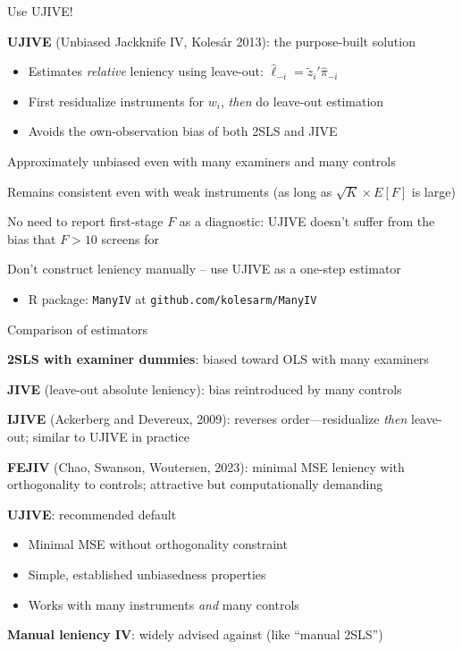 \documentclass[notes,11pt, aspectratio=169]{beamer}
\newenvironment{wideitemize}{\itemize\addtolength{\itemsep}{10pt}}{\enditemize}
\begin{document}
\begin{frame}{Use UJIVE!}
  \begin{wideitemize}
  \item \textbf{UJIVE} (Unbiased Jackknife IV, Koles\'{a}r 2013): the purpose-built solution
    \begin{itemize}
    \item Estimates \emph{relative} leniency using leave-out: $\hat{\ell}_{-i} = \tilde{z}_{i}'\hat{\pi}_{-i}$
    \item First residualize instruments for $w_{i}$, \emph{then} do leave-out estimation
    \item Avoids the own-observation bias of both 2SLS and JIVE
    \end{itemize}
  \item Approximately unbiased even with many examiners and many controls
  \item Remains consistent even with weak instruments (as long as $\sqrt{K} \times E[F]$ is large)
  \item No need to report first-stage $F$ as a diagnostic: UJIVE doesn't suffer from the bias that $F > 10$ screens for
  \item Don't construct leniency manually -- use UJIVE as a one-step estimator
    \begin{itemize}
    \item R package: \texttt{ManyIV} at \texttt{github.com/kolesarm/ManyIV}
    \end{itemize}
  \end{wideitemize}
\end{frame}

\begin{frame}{Comparison of estimators}
  \begin{wideitemize}
  \item \textbf{2SLS with examiner dummies}: biased toward OLS with many examiners
  \item \textbf{JIVE} (leave-out absolute leniency): bias reintroduced by many controls
  \item \textbf{IJIVE} (Ackerberg and Devereux, 2009): reverses order---residualize \emph{then} leave-out; similar to UJIVE in practice
  \item \textbf{FEJIV} (Chao, Swanson, Woutersen, 2023): minimal MSE leniency with orthogonality to controls; attractive but computationally demanding 
  \item \textbf{UJIVE}: recommended default
    \begin{itemize}
    \item Minimal MSE without orthogonality constraint
    \item Simple, established unbiasedness properties
    \item Works with many instruments \emph{and} many controls
    \end{itemize}
  \item \textbf{Manual leniency IV}: widely advised against (like ``manual 2SLS'')
  \end{wideitemize}
\end{frame}
\end{document}
